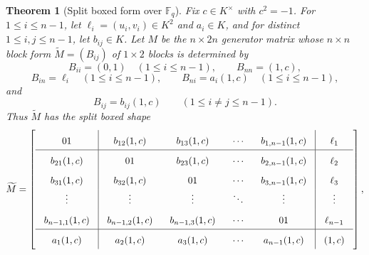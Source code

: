 \documentclass[12pt]{article}
\newtheorem{theorem}{Theorem}[section]
\newcommand{\F}{\mathbb{F}}
\begin{document}
\begin{theorem}[Split boxed form over \texorpdfstring{$\F_q$}{Fq}]
\label{thm:split-boxed-form}
Fix \(c\in K^\times\) with \(c^2=-1\). For \(1\le i\le n-1\), let \(\ell_i=(u_i,v_i)\in K^2\) and \(a_i\in K\), and for distinct \(1\le i,j\le n-1\), let \(b_{ij}\in K\). Let \(M\) be the \(n\times 2n\) generator matrix whose \(n\times n\) block form \(\widetilde M=(B_{ij})\) of \(1\times 2\) blocks is determined by
\[
B_{ii}=(0,1)\quad (1\le i\le n-1),\qquad B_{nn}=(1,c),
\]
\[
B_{in}=\ell_i \quad (1\le i\le n-1),\qquad
B_{ni}=a_i(1,c)\quad (1\le i\le n-1),
\]
and
\[
B_{ij}=b_{ij}(1,c)\qquad (1\le i\neq j\le n-1).
\]
Thus \(\widetilde M\) has the split boxed shape
\[
\begingroup
\setlength{\arraycolsep}{9pt}
\renewcommand{\arraystretch}{1.72}
\widetilde M=
\left[
\begin{array}{c|cccc|c}
01 & b_{12}(1,c) & b_{13}(1,c) & \cdots & b_{1,n-1}(1,c) & \ell_1 \\
\hline
b_{21}(1,c) & 01 & b_{23}(1,c) & \cdots & b_{2,n-1}(1,c) & \ell_2 \\
b_{31}(1,c) & b_{32}(1,c) & 01 & \cdots & b_{3,n-1}(1,c) & \ell_3 \\
\vdots & \vdots & \vdots & \ddots & \vdots & \vdots \\
b_{n-1,1}(1,c) & b_{n-1,2}(1,c) & b_{n-1,3}(1,c) & \cdots & 01 & \ell_{n-1} \\
\hline
a_1(1,c) & a_2(1,c) & a_3(1,c) & \cdots & a_{n-1}(1,c) & (1,c)
\end{array}
\right],
\endgroup
\]


\end{theorem}
\end{document}
